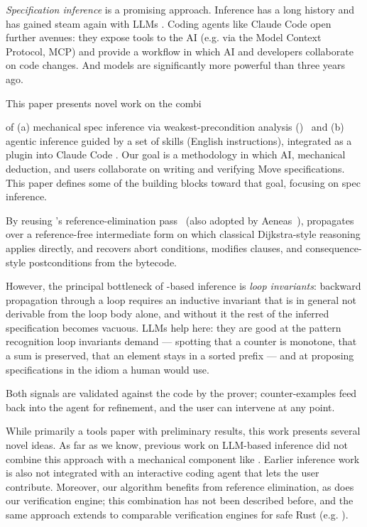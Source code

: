 %


\emph{Specification inference} is a promising approach. Inference has a long history \cite{DaikonTSE01} and has gained steam again with LLMs \cite{PeiEtAl23, KamathEtAl23}.
Coding agents like Claude Code \cite{ClaudeCode} open further avenues: they expose tools to the AI (e.g. via the Model Context Protocol, MCP) and provide a workflow in which AI and developers collaborate on code changes. And models are significantly more powerful than three years ago.

This paper presents novel work on the combi


of (a) mechanical spec inference via weakest-precondition analysis (\WP)~\cite{dijkstra1975wp,BL05} and (b) agentic inference guided by a set of skills (English instructions), integrated as a plugin into Claude Code \cite{ClaudeCodePlugins}.
Our goal is a methodology in which AI, mechanical deduction, and users collaborate on writing and verifying Move specifications.
This paper defines some of the building blocks toward that goal, focusing on spec inference.

By reusing \MVP's reference-elimination pass~\cite{DillGPQXZ22} (also adopted by Aeneas~\cite{Aeneas}), \WP propagates over a reference-free intermediate form on which classical Dijkstra-style reasoning applies directly, and recovers abort conditions, modifies clauses, and consequence-style postconditions from the bytecode.

However, the principal bottleneck of \WP-based inference is \emph{loop invariants}: backward propagation through a loop requires an inductive invariant that is in general not derivable from the loop body alone, and without it the rest of the inferred specification becomes vacuous.
LLMs help here: they are good at the pattern recognition loop invariants demand --- spotting that a counter is monotone, that a sum is preserved, that an element stays in a sorted prefix --- and at proposing specifications in the idiom a human would use.

Both signals are validated against the code by the prover; counter-examples feed back into the agent for refinement, and the user can intervene at any point.

 While primarily a tools paper with preliminary results, this work presents several novel ideas.
As far as we know, previous work on LLM-based inference did not combine this approach with a mechanical component like \WP.
Earlier inference work is also not integrated with an interactive coding agent that lets the user contribute.
Moreover, our \WP algorithm benefits from reference elimination, as does our verification engine; this combination has not been described before, and the same approach extends to comparable verification engines for safe Rust (e.g. \cite{Aeneas}).


